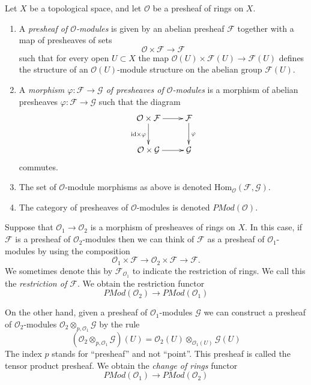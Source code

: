 \begin{definition}
\label{definition-presheaf-modules}
Let $X$ be a topological space, and let $\mathcal{O}$ be
a presheaf of rings on $X$.
\begin{enumerate}
\item A {\it presheaf of $\mathcal{O}$-modules}
is given by an abelian presheaf $\mathcal{F}$ together with a
map of presheaves of sets
$$
\mathcal{O} \times \mathcal{F} \longrightarrow \mathcal{F}
$$
such that for every open $U \subset X$ the map
$\mathcal{O}(U) \times \mathcal{F}(U) \to \mathcal{F}(U)$
defines the structure of an $\mathcal{O}(U)$-module
structure on the abelian group $\mathcal{F}(U)$.
\item A {\it morphism $\varphi : \mathcal{F} \to \mathcal{G}$
of presheaves of $\mathcal{O}$-modules} is a morphism of abelian presheaves
$\varphi : \mathcal{F} \to \mathcal{G}$ such that
the diagram
$$
\xymatrix{
\mathcal{O} \times \mathcal{F} \ar[r] \ar[d]_{\text{id}\times \varphi} &
\mathcal{F} \ar[d]^{\varphi} \\
\mathcal{O} \times \mathcal{G} \ar[r] &
\mathcal{G}
}
$$
commutes.
\item The set of $\mathcal{O}$-module morphisms as above is
denoted $\text{Hom}_{\mathcal{O}}(\mathcal{F}, \mathcal{G})$.
\item The category of presheaves of $\mathcal{O}$-modules
is denoted $\textit{PMod}(\mathcal{O})$.
\end{enumerate}
\end{definition}

\noindent
Suppose that $\mathcal{O}_1 \to \mathcal{O}_2$ is a
morphism of presheaves of rings on $X$. In this case,
if $\mathcal{F}$ is a presheaf of $\mathcal{O}_2$-modules
then we can think of $\mathcal{F}$ as a presheaf of
$\mathcal{O}_1$-modules by using the composition
$$
\mathcal{O}_1 \times \mathcal{F}
\to
\mathcal{O}_2 \times \mathcal{F}
\to
\mathcal{F}.
$$
We sometimes denote this by $\mathcal{F}_{\mathcal{O}_1}$
to indicate the restriction of rings. We call this
the {\it restriction of $\mathcal{F}$}. We obtain the
restriction functor
$$
\textit{PMod}(\mathcal{O}_2)
\longrightarrow
\textit{PMod}(\mathcal{O}_1)
$$

\medskip\noindent
On the other hand, given a presheaf of $\mathcal{O}_1$-modules
$\mathcal{G}$
we can construct a presheaf of $\mathcal{O}_2$-modules
$\mathcal{O}_2 \otimes_{p, \mathcal{O}_1} \mathcal{G}$
by the rule
$$
\left(\mathcal{O}_2 \otimes_{p, \mathcal{O}_1} \mathcal{G}\right)(U)
=
\mathcal{O}_2(U) \otimes_{\mathcal{O}_1(U)} \mathcal{G}(U)
$$
The index $p$ stands for ``presheaf'' and not ``point''.
This presheaf is called the tensor product presheaf. We obtain
the {\it change of rings} functor
$$
\textit{PMod}(\mathcal{O}_1)
\longrightarrow
\textit{PMod}(\mathcal{O}_2)
$$

